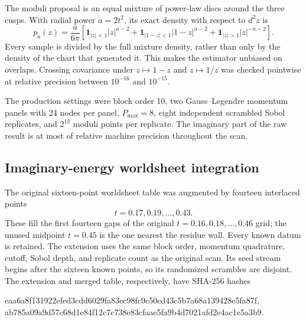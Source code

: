 \documentclass[11pt]{article}
\begin{document}
The moduli proposal is an equal mixture of power-law discs around the three
cusps.  With radial power $a=2t^2$, its exact density with respect to $d^2z$
is
\begin{equation}
 p_a(z)=\frac{a}{6\pi}\left[
 \mathbf 1_{|z|<1}|z|^{a-2}
 +\mathbf 1_{|1-z|<1}|1-z|^{a-2}
 +\mathbf 1_{|z|>1}|z|^{-a-2}\right].
 \label{eq:Q3-three-chart-proposal}
\end{equation}
Every sample is divided by the full mixture density, rather than only by the
density of the chart that generated it.  This makes the estimator unbiased
on overlaps.  Crossing covariance under $z\mapsto1-z$ and $z\mapsto1/z$ was
checked pointwise at relative precision between $10^{-16}$ and $10^{-15}$.

The production settings were block order 10, two Gauss--Legendre momentum
panels with 24 nodes per panel, $P_{\max}=8$, eight independent scrambled
Sobol replicates, and $2^{13}$ moduli points per replicate.  The imaginary
part of the raw result is at most of relative machine precision throughout
the scan.

\subsection{Imaginary-energy worldsheet integration}

The original sixteen-point worldsheet table was augmented by fourteen
interlaced points
\begin{equation}
 t=0.17,0.19,\ldots,0.43.
\end{equation}
These fill the first fourteen gaps of the original
$t=0.16,0.18,\ldots,0.46$ grid; the unused midpoint $t=0.45$ is the one
nearest the residue wall.  Every known datum is retained.  The extension uses
the same block order, momentum quadrature, cutoff, Sobol depth, and replicate
count as the original scan.  Its seed stream begins after the sixteen known
points, so its randomized scrambles are disjoint.  The extension and merged
table, respectively, have SHA-256 hashes
\begin{center}
\small\ttfamily
eaa6a8f131922efed3cdd6029fa83ec98fc9c50ed43c5b7a68a139428e5fa87f,
\\
ab785a09a9d57c68d1e84f12c7c738e83cfaae5fa9b4d7021afd2e4ac1e5a3b9.
\end{center}
\end{document}
